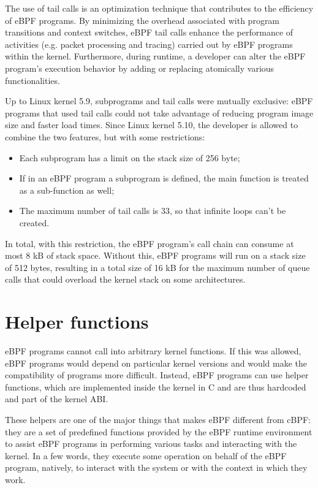 The use of tail calls is an optimization technique that contributes to the efficiency of eBPF programs. 
By minimizing the overhead associated with program transitions and context switches, eBPF tail calls enhance the performance of activities (e.g. packet processing and tracing) carried out by eBPF programs within the kernel.
Furthermore, during runtime, a developer can alter the eBPF program's execution behavior by adding or replacing atomically various functionalities.

Up to Linux kernel 5.9, subprograms and tail calls were mutually exclusive: eBPF programs that used tail calls could not take advantage of reducing program image size and faster load times.
Since Linux kernel 5.10, the developer is allowed to combine the two features, but with some restrictions:

\begin{itemize}
	\item Each subprogram has a limit on the stack size of 256 byte;
	\item If in an eBPF program a subprogram is defined, the main function is treated 
		as a sub-function as well;
	\item The maximum number of tail calls is 33, so that infinite loops can't be 
		created.
\end{itemize}

In total, with this restriction, the eBPF program’s call chain can consume at most 8 kB of stack space. 
Without this, eBPF programs will run on a stack size of 512 bytes, resulting in a total size of 16 kB for the maximum number of queue calls that could overload the kernel stack on some architectures.

\section{Helper functions}

eBPF programs cannot call into arbitrary kernel functions. 
If this was allowed, eBPF programs would depend on particular kernel versions and would make the compatibility of programs more difficult. 
Instead, eBPF programs can use helper functions, which are implemented inside the kernel in C and are thus hardcoded and part of the kernel ABI. 

These helpers are one of the major things that makes eBPF different from cBPF: they are a set of predefined functions provided by the eBPF runtime environment to assist eBPF programs in performing various tasks and interacting with the kernel.
In a few words, they execute some operation on behalf of the eBPF program, natively, to interact with the system or with the context in which they work. 

